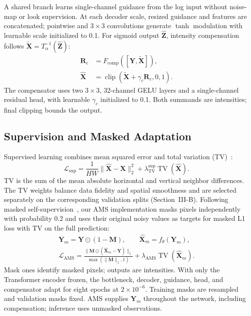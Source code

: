 \documentclass[journal]{IEEEtran}
\newcommand{\vect}[1]{\bm{#1}}
\newcommand{\rev}[1]{{\color{RevisionBlue}#1}}
\newcommand{\condensed}[1]{{\color{CondensedGreen}#1}}
\newcommand{\rev}[1]{#1}
\newcommand{\condensed}[1]{#1}
\begin{document}
\condensed{A shared branch learns single-channel guidance from the log input without noise-map or look supervision. At each decoder scale, resized guidance and features are concatenated; pointwise and \(3\times3\) convolutions generate \(\tanh\) modulation with learnable scale initialized to 0.1. For sigmoid output \(\widehat{\vect{Z}}\), intensity compensation follows \(\widetilde{\vect{X}}=T_\alpha^{-1}(\widehat{\vect{Z}})\):}
\begin{equation}
\begin{aligned}
\vect{R}_{c} &= F_{\mathrm{comp}}
 ([\vect{Y},\widetilde{\vect{X}}]),\\
\widehat{\vect{X}} &= \operatorname{clip}
 (\widetilde{\vect{X}}+\gamma_c\vect{R}_{c},0,1).
\end{aligned}
\label{eq:compensation}
\end{equation}
\condensed{The compensator uses two \(3\times3\), 32-channel GELU layers and a single-channel residual head, with learnable \(\gamma_c\) initialized to 0.1. Both summands are intensities; final clipping bounds the output.}

\subsection{Supervision and Masked Adaptation}
\condensed{Supervised learning combines mean squared error and total variation (TV)~\cite{perera2022}:}
\begin{equation}
\mathcal{L}_{\mathrm{sup}}=
\frac{1}{HW}\lVert\widehat{\vect{X}}-\vect{X}\rVert_2^2
+\lambda_{\mathrm{TV}}^{\mathrm{sup}}\operatorname{TV}(\widehat{\vect{X}}).
\label{eq:supervised}
\end{equation}
TV is the sum of the mean absolute horizontal and vertical neighbor differences. \rev{The TV weights balance data fidelity and spatial smoothness and are selected separately on the corresponding validation splits (Section~III-B).} Following masked self-supervision~\cite{lin2025}, our AMS implementation masks pixels independently with probability 0.2 and uses their original noisy values as targets for masked L1 loss with TV on the full prediction:
\begin{equation}
\begin{gathered}
\vect{Y}_m=\vect{Y}\odot(1-\vect{M}),\qquad
\widehat{\vect{X}}_m=f_{\theta}(\vect{Y}_m),\\[3pt]
\mathcal{L}_{\mathrm{AMS}}=
\frac{\lVert\vect{M}\odot(\widehat{\vect{X}}_m-\vect{Y})\rVert_1}
{\max(\lVert\vect{M}\rVert_1,1)}
+\lambda_{\mathrm{AMS}}\operatorname{TV}(\widehat{\vect{X}}_m).
\end{gathered}
\label{eq:ams}
\end{equation}
\condensed{Mask ones identify masked pixels; outputs are intensities. With only the Transformer encoder frozen, the bottleneck, decoder, guidance, head, and compensator adapt for eight epochs at \rev{\(2\times10^{-6}\)}. Training masks are resampled and validation masks fixed. AMS supplies \(\vect{Y}_m\) throughout the network, including compensation; inference uses unmasked observations.}
\end{document}
